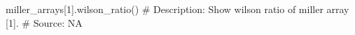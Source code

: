 miller_arrays[1].wilson_ratio()
# Description:  Show wilson ratio of miller array [1].
# Source:  NA

